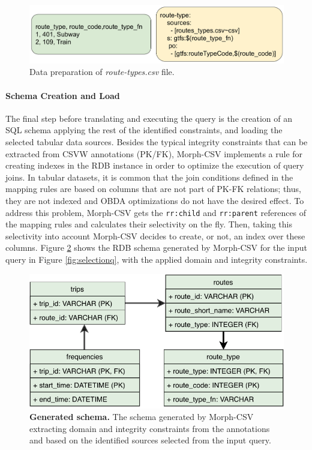 \begin{figure}[h]
    \centering
    \includegraphics[width=1\linewidth]{figures/steps/creation-result.pdf}
    \caption[Data preparation step]{Data preparation of \textit{route-types.csv} file.}
    \label{fig:preparation}
\end{figure}

\paragraph{Schema Creation and Load}
The final step before translating and executing the query is the creation of an SQL schema applying the rest of the identified constraints, and loading the selected tabular data sources. Besides the typical integrity constraints that can be extracted from CSVW annotations (PK/FK), Morph-CSV implements a rule for creating indexes in the RDB instance in order to optimize the execution of query joins. In tabular datasets, it is common that the join conditions defined in the mapping rules are based on columns that are not part of PK-FK relations; thus, they are not indexed and OBDA optimizations do not have the desired effect. To address this problem, Morph-CSV gets the \texttt{rr:child} and \texttt{rr:parent} references of the mapping rules and calculates their selectivity on the fly. Then, taking this selectivity into account Morph-CSV decides to create, or not, an index over these columns. Figure \ref{fig:rdb} shows the RDB schema generated by Morph-CSV for the input query in Figure \ref{fig:selectionq}, with the applied domain and integrity constraints. 

\begin{figure}[h]
    \centering
    \includegraphics[width=0.8\linewidth]{figures/steps/rdb.pdf}
    \caption[Generated schema]{\textbf{Generated schema.} The schema generated by Morph-CSV extracting domain and integrity constraints from the annotations and based on the identified sources selected from the input query.}
    \label{fig:rdb}
\end{figure}


